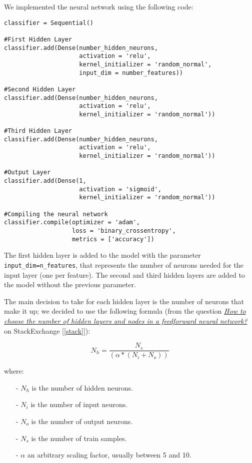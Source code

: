 We implemented the neural network using the following code:

\begin{lstlisting}[caption={Neural Network model},label={lst:nn-model}]
classifier = Sequential()

#First Hidden Layer
classifier.add(Dense(number_hidden_neurons, 
                     activation = 'relu', 
                     kernel_initializer = 'random_normal', 
                     input_dim = number_features))

#Second Hidden Layer
classifier.add(Dense(number_hidden_neurons, 
                     activation = 'relu', 
                     kernel_initializer = 'random_normal'))

#Third Hidden Layer
classifier.add(Dense(number_hidden_neurons, 
                     activation = 'relu', 
                     kernel_initializer = 'random_normal'))

#Output Layer
classifier.add(Dense(1, 
                     activation = 'sigmoid', 
                     kernel_initializer = 'random_normal'))

#Compiling the neural network
classifier.compile(optimizer = 'adam', 
                   loss = 'binary_crossentropy', 
                   metrics = ['accuracy'])
\end{lstlisting}

The first hidden layer is added to the model with the parameter \texttt{input\_dim=n\_features}, that represents the number of neurons needed for the input layer (one per feature). The second and third hidden layers are added to the model without the previous parameter.

The main decision to take for each hidden layer is the number of neurons that make it up; we decided to use the following formula (from the question \href{https://stats.stackexchange.com/questions/181/how-to-choose-the-number-of-hidden-layers-and-nodes-in-a-feedforward-neural-netw}{\textit{How to choose the number of hidden layers and nodes in a feedforward neural network?}} on StackExchange [\ref{stack}]):

\begin{equation}
N_h = \frac{N_s}{(\alpha * (N_i + N_o))}
\end{equation}

where:
\begin{itemize}
	
	\item[-] $N_h$ is the number of hidden neurons.
	
	\item[-] $N_i$ is the number of input neurons.
	
	\item[-] $N_o$ is the number of output neurons.
	
	\item[-] $N_s$ is the number of train samples.
	
	\item[-] $\alpha$ an arbitrary scaling factor, usually between 5 and 10.  
	
\end{itemize}

